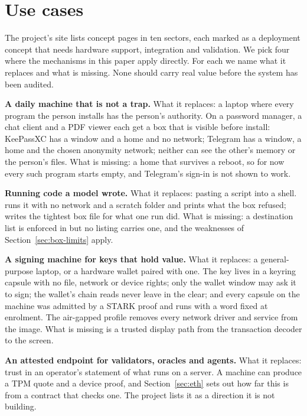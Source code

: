 \section{Use cases}\label{sec:use}

The project's site lists concept pages in ten sectors, each marked as a deployment concept that needs hardware support, integration and validation. We pick four where the mechanisms in this paper apply directly. For each we name what it replaces and what is missing. None should carry real value before the system has been audited.

\textbf{A daily machine that is not a trap.} What it replaces: a laptop where every program the person installs has the person's authority. On \nonos{} a password manager, a chat client and a PDF viewer each get a box that is visible before install: KeePassXC has a window and a home and no network; Telegram has a window, a home and the chosen anonymity network; neither can see the other's memory or the person's files. What is missing: a home that survives a reboot, so for now every such program starts empty, and Telegram's sign-in is not shown to work.

\textbf{Running code a model wrote.} What it replaces: pasting a script into a shell.  runs it with no network and a scratch folder and prints what the box refused;  writes the tightest box file for what one run did. What is missing: a destination list is enforced in  but no listing carries one, and the weaknesses of Section~\ref{sec:box-limits} apply.

\textbf{A signing machine for keys that hold value.} What it replaces: a general-purpose laptop, or a hardware wallet paired with one. The key lives in a keyring capsule with no file, network or device rights; only the wallet window may ask it to sign; the wallet's chain reads never leave in the clear; and every capsule on the machine was admitted by a STARK proof and runs with a word fixed at enrolment. The air-gapped profile removes every network driver and service from the image. What is missing is a trusted display path from the transaction decoder to the screen.

\textbf{An attested endpoint for validators, oracles and agents.} What it replaces: trust in an operator's statement of what runs on a server. A \nonos{} machine can produce a TPM quote and a device proof, and Section~\ref{sec:eth} sets out how far this is from a contract that checks one. The project lists it as a direction it is not building.

